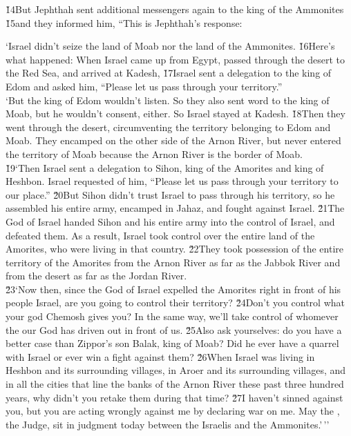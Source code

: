 \v{14}But Jephthah sent additional messengers again to the king of the Ammonites \v{15}and they informed him, ``This is Jephthah's response:

\begin{poetry}
\poeml `Israel didn't seize the land of Moab nor the land of the Ammonites. \v{16}Here's what happened: When Israel came up from Egypt, passed through the desert to the Red Sea, and arrived at Kadesh, \v{17}Israel sent a delegation to the king of Edom and asked him, ``Please let us pass through your territory.'' \\
\poeml `But the king of Edom wouldn't listen. So they also sent word to the king of Moab, but he wouldn't consent, either. So Israel stayed at Kadesh. \v{18}Then they went through the desert, circumventing the territory belonging to Edom and Moab. They encamped on the other side of the Arnon River, but never entered the territory of Moab because the Arnon River is the border of Moab. \\
\poeml \v{19}`Then Israel sent a delegation to Sihon, king of the Amorites and king of Heshbon. Israel requested of him, ``Please let us pass through your territory to our place.'' \v{20}But Sihon didn't trust Israel to pass through his territory, so he assembled his entire army, encamped in Jahaz, and fought against Israel. \v{21}The  God of Israel handed Sihon and his entire army into the control of Israel, and defeated them. As a result, Israel took control over the entire land of the Amorites, who were living in that country. \v{22}They took possession of the entire territory of the Amorites from the Arnon River as far as the Jabbok River and from the desert as far as the Jordan River. \\
\poeml \v{23}`Now then, since the  God of Israel expelled the Amorites right in front of his people Israel, are you going to control their territory? \v{24}Don't you control what your god Chemosh gives you? In the same way, we'll take control of whomever the  our God has driven out in front of us. \v{25}Also ask yourselves: do you have a better case than Zippor's son Balak, king of Moab? Did he ever have a quarrel with Israel or ever win a fight against them? \v{26}When Israel was living in Heshbon and its surrounding villages, in Aroer and its surrounding villages, and in all the cities that line the banks of the Arnon River these past three hundred years, why didn't you retake them during that time? \v{27}I haven't sinned against you, but you are acting wrongly against me by declaring war on me. May the , the Judge, sit in judgment today between the Israelis and the Ammonites.'\,''
\end{poetry}

